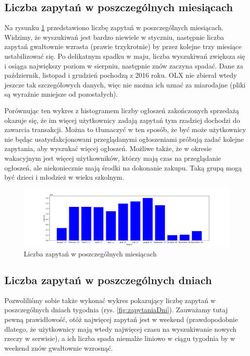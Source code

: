 \documentclass[a4paper,11pt]{article}
\begin{document}
\subsection{Liczba zapytań w poszczególnych miesiącach}
Na rysunku \ref{fig:zapytaniaMiesiace} przedstawiono liczbę zapytań w poszczególnych miesiącach. Widzimy, że wyszukiwań jest bardzo niewiele w styczniu, następnie liczba zapytań gwałtownie wzrasta (prawie trzykrotnie) by przez kolejne trzy miesiące ustabilizować się. Po delikatnym spadku w maju, liczba wyszukiwań zwiększa się i osiąga największy poziom w sierpniu, następnie znów zaczyna spadać. Dane za październik, listopad i grudzień pochodzą z 2016 roku. OLX nie zbierał wtedy jeszcze tak szczegółowych danych, więc nie można ich uznać za miarodajne (pliki są wyraźnie mniejsze od pozostałych). 

Porównując ten wykres z histogramem liczby ogłoszeń zakończonych sprzedażą okazuje się, że im więcej użytkownicy zadają zapytań tym rzadziej dochodzi do zawarcia transakcji. Można to tłumaczyć w ten sposób, że być może użytkownicy nie będąc usatysfakcjonowani przeglądanymi ogłoszeniami próbują zadać kolejne zapytania, aby wyszukać więcej ogłoszeń. Możliwe także, że w okresie wakacyjnym jest więcej użytkowników, którzy mają czas na przeglądanie ogłoszeń, ale niekoniecznie mają środki na dokonanie zakupu. Taką grupą mogą być dzieci i młodzież w wieku szkolnym.

\begin{figure}[!ht]
\centering
\includegraphics[width=1.0\textwidth]{images/liczba_zapytan_w_miesiacach.png}
\caption{\label{fig:zapytaniaMiesiace} Liczba zapytań w poszczególnych miesiącach}
\end{figure}

\subsection{Liczba zapytań w poszczególnych dniach}
Pozwoliliśmy sobie także wykonać wykres pokazujący liczbę zapytań w poszczególnych dniach tygodnia (rys. \ref{fig:zapytaniaDni}). Zauważamy tutaj pewną prawidłowość, otóż najwięcej zapytań jest w weekend (prawdopodobnie dlatego, że użytkownicy mają wtedy najwięcej czasu na wyszukiwanie nowych rzeczy w serwisie), a ich liczba spada niemalże liniowo w ciągu tygodnia by w weekend znów gwałtownie wzrosnąć.
 
\end{document}

